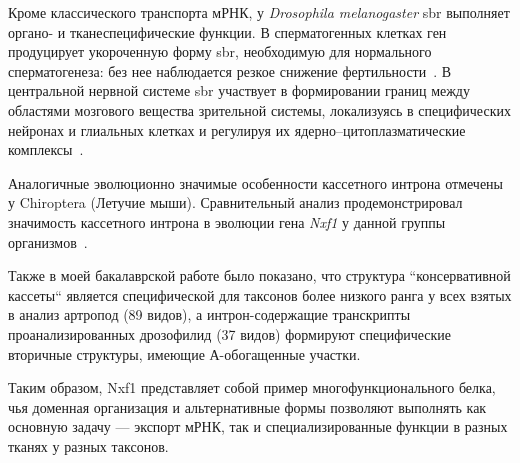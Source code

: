 Кроме классического транспорта мРНК, у \textit{Drosophila melanogaster} sbr выполняет органо- и тканеспецифические функции.
В сперматогенных клетках ген продуцирует укороченную форму sbr, необходимую для нормального сперматогенеза: без нее наблюдается резкое снижение фертильности~\cite{Ginanova2016}.
В центральной нервной системе sbr участвует в формировании границ между областями мозгового вещества зрительной системы, локализуясь в специфических нейронах и глиальных клетках и регулируя их ядерно–цитоплазматические комплексы~\cite{Mamon2021}.

Аналогичные эволюционно значимые особенности кассетного интрона отмечены у Chiroptera (Летучие мыши).
Сравнительный анализ продемонстрировал значимость кассетного интрона в эволюции гена \textit{Nxf1} у данной группы организмов~\cite{Bondaruk2022}.

Также в моей бакалаврской работе было показано, что структура ``консервативной кассеты`` является специфической для таксонов более низкого ранга у всех взятых в анализ артропод (89 видов), а интрон-содержащие транскрипты проанализированных дрозофилид (37 видов) формируют специфические вторичные структуры, имеющие А-обогащенные участки.

Таким образом, Nxf1 представляет собой пример многофункционального белка, чья доменная организация и альтернативные формы позволяют выполнять как основную задачу — экспорт мРНК, так и специализированные функции в разных тканях у разных таксонов.
